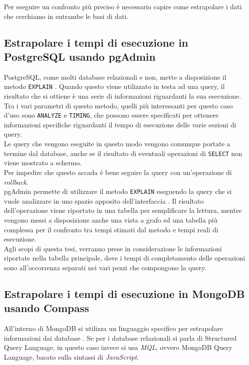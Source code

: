 Per eseguire un confronto più preciso è necessario capire come estrapolare i dati che cerchiamo in entrambe le basi di dati.

\subsection{Estrapolare i tempi di esecuzione in PostgreSQL usando pgAdmin}
PostgreSQL, come molti database relazionali e non, mette a disposizione il metodo \texttt{EXPLAIN} \cite{site:postgresdocs}. Quando questo viene utilizzato in testa ad una query, il risultato che si ottiene è una serie di informazioni riguardanti la sua esecuzione. Tra i vari parametri di questo metodo, quelli più interessanti per questo caso d'uso sono \texttt{ANALYZE} e \texttt{TIMING}, che possono essere specificati per ottenere informazioni specifiche riguardanti il tempo di esecuzione delle varie sezioni di query.\\
Le query che vengono eseguite in questo modo vengono comunque portate a termine dal database, anche se il risultato di eventuali operazioni di \texttt{SELECT} non viene mostrato a schermo.\\
Per impedire che questo accada è bene seguire la query con un'operazione di \textit{rollback}.\\

\noindent pgAdmin permette di utilizzare il metodo \texttt{EXPLAIN} eseguendo la query che si vuole analizzare in uno spazio apposito dell'interfaccia \cite{site:pgAdmin}. Il risultato dell'operazione viene riportato in una tabella per semplificare la lettura, mentre vengono messi a disposizione anche una vista a grafo ed una tabella più complessa per il confronto tra tempi stimati dal metodo e tempi reali di esecuzione.\\
Agli scopi di questa tesi, verranno prese in considerazione le informazioni riportate nella tabella principale, dove i tempi di completamento delle operazioni sono all'occorrenza separati nei vari pezzi che compongono la query.

\subsection{Estrapolare i tempi di esecuzione in MongoDB usando Compass}
All'interno di MongoDB si utilizza un linguaggio specifico per estrapolare informazioni dai database \cite{site:mongodb}. Se per i database relazionali si parla di Structured Query Language, in questo caso invece si usa \textit{MQL}, ovvero MongoDB Query Language, basato sulla sintassi di \textit{JavaScript}.\\

